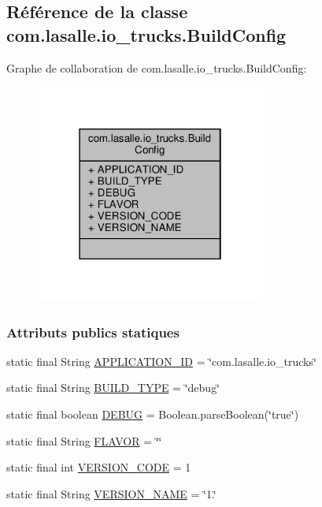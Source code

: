 \hypertarget{classcom_1_1lasalle_1_1io__trucks_1_1_build_config}{}\subsection{Référence de la classe com.\+lasalle.\+io\+\_\+trucks.\+Build\+Config}
\label{classcom_1_1lasalle_1_1io__trucks_1_1_build_config}


Graphe de collaboration de com.\+lasalle.\+io\+\_\+trucks.\+Build\+Config\+:
\nopagebreak
\begin{figure}[H]
\begin{center}
\leavevmode
\includegraphics[width=214pt]{classcom_1_1lasalle_1_1io__trucks_1_1_build_config__coll__graph}
\end{center}
\end{figure}
\subsubsection*{Attributs publics statiques}
\begin{DoxyCompactItemize}
\item 
static final String \hyperlink{classcom_1_1lasalle_1_1io__trucks_1_1_build_config_ae007ee82a204de57c672dd24f9715458}{A\+P\+P\+L\+I\+C\+A\+T\+I\+O\+N\+\_\+\+ID} = \char`\"{}com.\+lasalle.\+io\+\_\+trucks\char`\"{}
\item 
static final String \hyperlink{classcom_1_1lasalle_1_1io__trucks_1_1_build_config_a7b245809f03928c22356fc88dde12e0d}{B\+U\+I\+L\+D\+\_\+\+T\+Y\+PE} = \char`\"{}debug\char`\"{}
\item 
static final boolean \hyperlink{classcom_1_1lasalle_1_1io__trucks_1_1_build_config_a572fb0da84ed960f78fa3e7825771c10}{D\+E\+B\+UG} = Boolean.\+parse\+Boolean(\char`\"{}true\char`\"{})
\item 
static final String \hyperlink{classcom_1_1lasalle_1_1io__trucks_1_1_build_config_a421abd3c1cb665c46542e800150f4e6e}{F\+L\+A\+V\+OR} = \char`\"{}\char`\"{}
\item 
static final int \hyperlink{classcom_1_1lasalle_1_1io__trucks_1_1_build_config_a41d69a4bce874271b6b8b95847d0f0ec}{V\+E\+R\+S\+I\+O\+N\+\_\+\+C\+O\+DE} = 1
\item 
static final String \hyperlink{classcom_1_1lasalle_1_1io__trucks_1_1_build_config_a0efad994a9b900e7436c53f5714760ab}{V\+E\+R\+S\+I\+O\+N\+\_\+\+N\+A\+ME} = \char`\"{}1.\char`\"{}
\end{DoxyCompactItemize}


